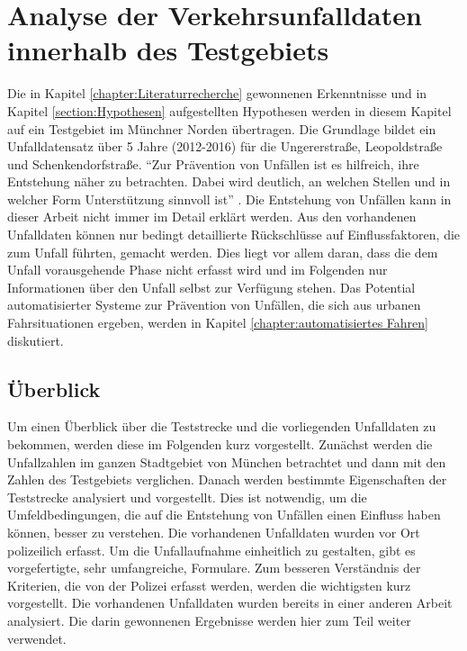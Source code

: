 
\chapter{Analyse der Verkehrsunfalldaten innerhalb des Testgebiets}\label{chapter:Datenauswertung}
Die in Kapitel \ref{chapter:Literaturrecherche} gewonnenen Erkenntnisse und in Kapitel \ref{section:Hypothesen} aufgestellten Hypothesen werden in diesem Kapitel auf ein Testgebiet im Münchner Norden übertragen. Die Grundlage bildet ein Unfalldatensatz über 5 Jahre (2012-2016) für die Ungererstraße, Leopoldstraße und Schenkendorfstraße. \enquote{Zur Prävention von Unfällen ist es hilfreich, ihre Entstehung näher zu betrachten. Dabei wird deutlich, an welchen Stellen und in welcher Form Unterstützung sinnvoll ist} \parencite[S. 43]{Fricke.2006}. Die Entstehung von Unfällen kann in dieser Arbeit nicht immer im Detail erklärt werden. Aus den vorhandenen Unfalldaten können nur bedingt detaillierte Rückschlüsse auf Einflussfaktoren, die zum Unfall führten, gemacht werden. Dies liegt vor allem daran, dass die dem Unfall vorausgehende Phase nicht erfasst wird und im Folgenden nur Informationen über den Unfall selbst zur Verfügung stehen. Das Potential automatisierter Systeme zur Prävention von Unfällen, die sich aus urbanen Fahrsituationen ergeben, werden in Kapitel \ref{chapter:automatisiertes Fahren} diskutiert.

\section{Überblick}\label{section:Überblick}
Um einen Überblick über die Teststrecke und die vorliegenden Unfalldaten zu bekommen, werden diese im Folgenden kurz vorgestellt. Zunächst werden die Unfallzahlen im ganzen Stadtgebiet von München betrachtet und dann mit den Zahlen des Testgebiets verglichen. Danach werden bestimmte Eigenschaften der Teststrecke analysiert und vorgestellt. Dies ist notwendig, um die Umfeldbedingungen, die auf die Entstehung von Unfällen einen Einfluss haben können, besser zu verstehen. Die vorhandenen Unfalldaten wurden vor Ort polizeilich erfasst. Um die Unfallaufnahme einheitlich zu gestalten, gibt es vorgefertigte, sehr umfangreiche, Formulare. Zum besseren Verständnis der Kriterien, die von der Polizei erfasst werden, werden die wichtigsten kurz vorgestellt. Die vorhandenen Unfalldaten wurden bereits in einer anderen Arbeit analysiert. Die darin gewonnenen Ergebnisse werden hier zum Teil weiter verwendet.

